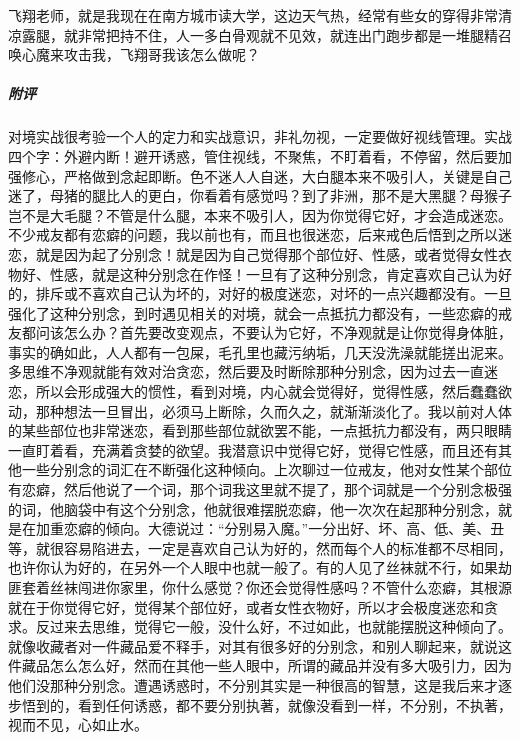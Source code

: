 \begin{case}
    飞翔老师，就是我现在在南方城市读大学，这边天气热，经常有些女的穿得非常清凉露腿，就非常把持不住，人一多白骨观就不见效，就连出门跑步都是一堆腿精召唤心魔来攻击我，飞翔哥我该怎么做呢？
    \subparagraph{附评} 对境实战很考验一个人的定力和实战意识，非礼勿视，一定要做好视线管理。实战四个字：外避内断！避开诱惑，管住视线，不聚焦，不盯着看，不停留，然后要加强修心，严格做到念起即断。色不迷人人自迷，大白腿本来不吸引人，关键是自己迷了，母猪的腿比人的更白，你看着有感觉吗？到了非洲，那不是大黑腿？母猴子岂不是大毛腿？不管是什么腿，本来不吸引人，因为你觉得它好，才会造成迷恋。不少戒友都有恋癖的问题，我以前也有，而且也很迷恋，后来戒色后悟到之所以迷恋，就是因为起了分别念！就是因为自己觉得那个部位好、性感，或者觉得女性衣物好、性感，就是这种分别念在作怪！一旦有了这种分别念，肯定喜欢自己认为好的，排斥或不喜欢自己认为坏的，对好的极度迷恋，对坏的一点兴趣都没有。一旦强化了这种分别念，到时遇见相关的对境，就会一点抵抗力都没有，一些恋癖的戒友都问该怎么办？首先要改变观点，不要认为它好，不净观就是让你觉得身体脏，事实的确如此，人人都有一包屎，毛孔里也藏污纳垢，几天没洗澡就能搓出泥来。多思维不净观就能有效对治贪恋，然后要及时断除那种分别念，因为过去一直迷恋，所以会形成强大的惯性，看到对境，内心就会觉得好，觉得性感，然后蠢蠢欲动，那种想法一旦冒出，必须马上断除，久而久之，就渐渐淡化了。我以前对人体的某些部位也非常迷恋，看到那些部位就欲罢不能，一点抵抗力都没有，两只眼睛一直盯着看，充满着贪婪的欲望。我潜意识中觉得它好，觉得它性感，而且还有其他一些分别念的词汇在不断强化这种倾向。上次聊过一位戒友，他对女性某个部位有恋癖，然后他说了一个词，那个词我这里就不提了，那个词就是一个分别念极强的词，他脑袋中有这个分别念，他就很难摆脱恋癖，他一次次在起那种分别念，就是在加重恋癖的倾向。大德说过：“分别易入魔。”一分出好、坏、高、低、美、丑等，就很容易陷进去，一定是喜欢自己认为好的，然而每个人的标准都不尽相同，也许你认为好的，在另外一个人眼中也就一般了。有的人见了丝袜就不行，如果劫匪套着丝袜闯进你家里，你什么感觉？你还会觉得性感吗？不管什么恋癖，其根源就在于你觉得它好，觉得某个部位好，或者女性衣物好，所以才会极度迷恋和贪求。反过来去思维，觉得它一般，没什么好，不过如此，也就能摆脱这种倾向了。就像收藏者对一件藏品爱不释手，对其有很多好的分别念，和别人聊起来，就说这件藏品怎么怎么好，然而在其他一些人眼中，所谓的藏品并没有多大吸引力，因为他们没那种分别念。遭遇诱惑时，不分别其实是一种很高的智慧，这是我后来才逐步悟到的，看到任何诱惑，都不要分别执著，就像没看到一样，不分别，不执著，视而不见，心如止水。
\end{case}

